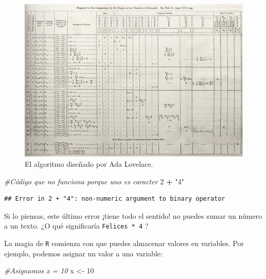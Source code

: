 \documentclass[
]{book}
\newenvironment{Shaded}{\begin{snugshade}}{\end{snugshade}}
\newcommand{\CommentTok}[1]{\textcolor[rgb]{0.56,0.35,0.01}{\textit{#1}}}
\newcommand{\DecValTok}[1]{\textcolor[rgb]{0.00,0.00,0.81}{#1}}
\newcommand{\NormalTok}[1]{#1}
\newcommand{\OperatorTok}[1]{\textcolor[rgb]{0.81,0.36,0.00}{\textbf{#1}}}
\newcommand{\StringTok}[1]{\textcolor[rgb]{0.31,0.60,0.02}{#1}}
\begin{document}
\begin{figure}

{\centering \includegraphics[width=26.67in]{images/algorithm_lovelace} 

}

\caption{El algoritmo diseñado por Ada Lovelace.}\label{fig:unnamed-chunk-55}
\end{figure}

\begin{Shaded}
\begin{Highlighting}[]
\CommentTok{#Código que no funciona porque uno es caracter}
\DecValTok{2} \OperatorTok{+}\StringTok{ "4"} 
\end{Highlighting}
\end{Shaded}

\begin{verbatim}
## Error in 2 + "4": non-numeric argument to binary operator
\end{verbatim}

Si lo piensas, este último error ¡tiene todo el sentido! no puedes sumar un número a un texto. ¿O qué significaría \texttt{\textquotesingle{}Felices\textquotesingle{}\ *\ 4} ?

La magia de \texttt{R} comienza con que puedes almacenar valores en variables. Por ejemplo, podemos asignar un valor a una variable:

\begin{Shaded}
\begin{Highlighting}[]
\CommentTok{#Asignamos x = 10}
\NormalTok{x <-}\StringTok{ }\DecValTok{10}
\end{Highlighting}
\end{Shaded}
\end{document}
